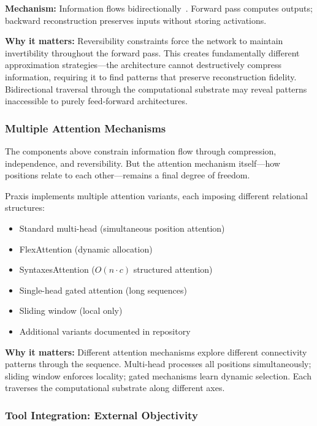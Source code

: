\documentclass{article}
\begin{document}
\textbf{Mechanism:} Information flows bidirectionally~\cite{gomez2017reversible}. Forward pass computes outputs; backward reconstruction preserves inputs without storing activations.

\textbf{Why it matters:} Reversibility constraints force the network to maintain invertibility throughout the forward pass. This creates fundamentally different approximation strategies—the architecture cannot destructively compress information, requiring it to find patterns that preserve reconstruction fidelity. Bidirectional traversal through the computational substrate may reveal patterns inaccessible to purely feed-forward architectures.

\subsubsection{Multiple Attention Mechanisms}

The components above constrain information flow through compression, independence, and reversibility. But the attention mechanism itself—how positions relate to each other—remains a final degree of freedom.

Praxis implements multiple attention variants, each imposing different relational structures:
\begin{itemize}[noitemsep]
    \item Standard multi-head (simultaneous position attention)
    \item FlexAttention (dynamic allocation)
    \item SyntaxesAttention ($O(n \cdot c)$ structured attention)
    \item Single-head gated attention (long sequences)
    \item Sliding window (local only)
    \item Additional variants documented in repository
\end{itemize}

\textbf{Why it matters:} Different attention mechanisms explore different connectivity patterns through the sequence. Multi-head processes all positions simultaneously; sliding window enforces locality; gated mechanisms learn dynamic selection. Each traverses the computational substrate along different axes.

\subsubsection{Tool Integration: External Objectivity}
\end{document}
